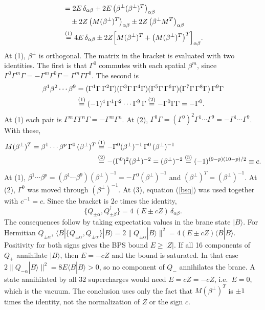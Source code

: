 \begin{tcolorbox}[breakable]
\begin{remark}
\begin{align*}
&= 2E\,\delta_{\alpha\beta} + 2E\,\big(\beta^\perp(\beta^\perp)^T\big)_{\alpha\beta} \\
&\quad \pm 2Z\,\big(M(\beta^\perp)^T\big)_{\alpha\beta} \pm 2Z\,\big(\beta^\perp M^T\big)_{\alpha\beta} \\
&\overset{(1)}{=} 4E\,\delta_{\alpha\beta} \pm 2Z\Big[M(\beta^\perp)^T + \big(M(\beta^\perp)^T\big)^T\Big]_{\alpha\beta} .
\end{align*}
At (1), $\beta^\perp$ is orthogonal. The matrix in the bracket is evaluated with two identities. The first is that $\Gamma^0$ commutes with each spatial $\beta^m$, since $\Gamma^0\Gamma^m\Gamma = -\Gamma^m\Gamma^0\Gamma = \Gamma^m\Gamma\Gamma^0$. The second is
\begin{align*}
\beta^1\beta^2\cdots\beta^9 &= (\Gamma^1\Gamma\,\Gamma^2\Gamma)(\Gamma^3\Gamma\,\Gamma^4\Gamma)(\Gamma^5\Gamma\,\Gamma^6\Gamma)(\Gamma^7\Gamma\,\Gamma^8\Gamma)\,\Gamma^9\Gamma \\
&\overset{(1)}{=} (-1)^4\,\Gamma^1\Gamma^2\cdots\Gamma^9\,\Gamma \overset{(2)}{=} -\Gamma^0\Gamma\Gamma = -\Gamma^0 .
\end{align*}
At (1) each pair is $\Gamma^m\Gamma\Gamma^n\Gamma = -\Gamma^m\Gamma^n$. At (2), $\Gamma^0\Gamma = (\Gamma^0)^2\Gamma^1\cdots\Gamma^9 = -\Gamma^1\cdots\Gamma^9$. With these,
\begin{align*}
M(\beta^\perp)^T = \beta^1\cdots\beta^p\,\Gamma^0\,(\beta^\perp)^T
&\overset{(1)}{=} -\Gamma^0(\beta^\perp)^{-1}\,\Gamma^0\,(\beta^\perp)^{-1}\\
&\overset{(2)}{=} -(\Gamma^0)^2(\beta^\perp)^{-2} = (\beta^\perp)^{-2} \overset{(3)}{=} (-1)^{(9-p)(10-p)/2} \equiv c .
\end{align*}
At (1), $\beta^1\cdots\beta^p = (\beta^1\cdots\beta^9)(\beta^\perp)^{-1} = -\Gamma^0(\beta^\perp)^{-1}$ and $(\beta^\perp)^T = (\beta^\perp)^{-1}$. At (2), $\Gamma^0$ was moved through $(\beta^\perp)^{-1}$. At (3), equation (\ref{bsq}) was used together with $c^{-1} = c$. Since the bracket is $2c$ times the identity,
\begin{equation}
\{Q_{\pm\alpha},Q_{\pm\beta}^\dagger\} = 4\,(E \pm cZ)\,\delta_{\alpha\beta}.
\tag{D.13}\label{bps}
\end{equation}
The consequences follow by taking expectation values in the brane state $|B\rangle$. For Hermitian $Q_{\pm\alpha}$, $\langle B|\{Q_{\pm\alpha},Q_{\pm\alpha}\}|B\rangle = 2\|Q_{\pm\alpha}|B\rangle\|^2 = 4(E\pm cZ)\langle B|B\rangle$. Positivity for both signs gives the BPS bound $E\ge|Z|$. If all 16 components of $Q_+$ annihilate $|B\rangle$, then $E = -cZ$ and the bound is saturated. In that case $2\|Q_{-\alpha}|B\rangle\|^2 = 8E\langle B|B\rangle > 0$, so no component of $Q_-$ annihilates the brane. A state annihilated by all 32 supercharges would need $E = cZ = -cZ$, i.e.\ $E = 0$, which is the vacuum. The conclusion uses only the fact that $M(\beta^\perp)^T$ is $\pm1$ times the identity, not the normalization of $Z$ or the sign $c$.


\end{remark}
\end{tcolorbox}
